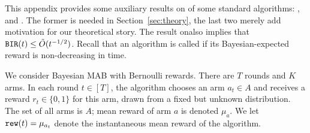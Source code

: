 

\newcommand{\ExplorExploit}{\term{ExplorExploit}}
\newcommand{\PhasedExplorExploit}{\term{PhasedExplorExploit}}
\newcommand{\SuccesiveEliminationReset}{\term{SuccesiveEliminationReset}}

\newcommand{\IReg}{R^{\term{inst}}} %




This appendix provides some auxiliary results on \bmonotonicity of some standard algorithms: \DynGreedy, \DynamicEpsGreedy and \Thompson. The former is needed in Section~\ref{sec:theory}, the last two merely add motivation for our theoretical story. The result on\Thompson also implies that $\mathtt{BIR}(t)\leq \tilde{O}(t^{-1/2})$. Recall that an algorithm is called \bmonotone if its Bayesian-expected reward is non-decreasing in time.

We consider Bayesian MAB with Bernoulli rewards. There are $T$ rounds and $K$ arms. In each round $t\in [T]$, the algorithm chooses an arm $a_t\in A$ and receives a reward $r_t\in\{0,1\}$ for this arm, drawn from a fixed but unknown distribution. The set of all arms is $A$; mean reward of arm $a$ is denoted $\mu_a$. 
We let
    $\mathtt{rew}(t) = \mu_{a_t}$
denote the instantaneous mean reward of the algorithm.


